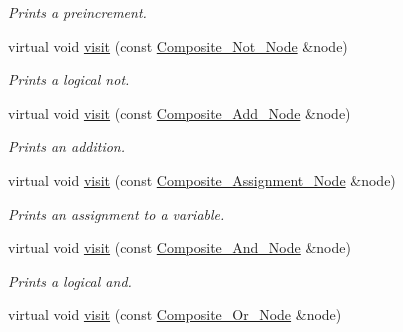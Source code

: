 \begin{DoxyCompactItemize}
\begin{DoxyCompactList}\small\item\em Prints a preincrement. \item\end{DoxyCompactList}\item 
virtual void \hyperlink{classMadara_1_1Expression__Tree_1_1Print__Visitor_a2958c4aef76f608c1b559f8ca4edebe6}{visit} (const \hyperlink{classMadara_1_1Expression__Tree_1_1Composite__Not__Node}{Composite\_\-Not\_\-Node} \&node)
\begin{DoxyCompactList}\small\item\em Prints a logical not. \item\end{DoxyCompactList}\item 
virtual void \hyperlink{classMadara_1_1Expression__Tree_1_1Print__Visitor_ac8bec51aa16da7b7e87dee002bc700f5}{visit} (const \hyperlink{classMadara_1_1Expression__Tree_1_1Composite__Add__Node}{Composite\_\-Add\_\-Node} \&node)
\begin{DoxyCompactList}\small\item\em Prints an addition. \item\end{DoxyCompactList}\item 
virtual void \hyperlink{classMadara_1_1Expression__Tree_1_1Print__Visitor_a76ec0ee448aae9e5c5c36937c35bb038}{visit} (const \hyperlink{classMadara_1_1Expression__Tree_1_1Composite__Assignment__Node}{Composite\_\-Assignment\_\-Node} \&node)
\begin{DoxyCompactList}\small\item\em Prints an assignment to a variable. \item\end{DoxyCompactList}\item 
virtual void \hyperlink{classMadara_1_1Expression__Tree_1_1Print__Visitor_a60a6a932f44dd353e8715971ad5f35a4}{visit} (const \hyperlink{classMadara_1_1Expression__Tree_1_1Composite__And__Node}{Composite\_\-And\_\-Node} \&node)
\begin{DoxyCompactList}\small\item\em Prints a logical and. \item\end{DoxyCompactList}\item 
virtual void \hyperlink{classMadara_1_1Expression__Tree_1_1Print__Visitor_a947c243aabff17a497483aca0e78f424}{visit} (const \hyperlink{classMadara_1_1Expression__Tree_1_1Composite__Or__Node}{Composite\_\-Or\_\-Node} \&node)

\end{DoxyCompactItemize}
